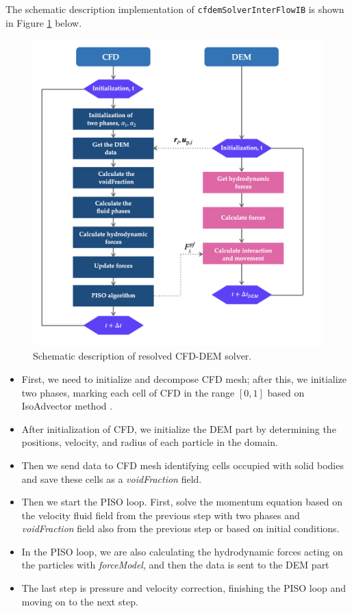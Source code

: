 The schematic description implementation of  \verb|cfdemSolverInterFlowIB| is shown in Figure \ref{fig:cfddemSolver} below. 
\begin{figure}[!ht]
    \centering
    \includegraphics[width=16cm]{Images/chap3/CFD-DEM_scheme.png}
    \caption{Schematic description of resolved CFD-DEM solver.}
    \label{fig:cfddemSolver}
\end{figure}
\begin{itemize}
    \item First, we need to initialize and decompose CFD mesh; after this, we initialize two phases, marking each cell of CFD in the range $[0,1]$ based on IsoAdvector method \cite{roenby2019isoadvector}.
    \item  After initialization of CFD, we initialize the DEM part by determining the positions, velocity, and radius of each particle in the domain.
    \item Then we send data to CFD mesh identifying cells occupied with solid bodies and save these cells as a \textit{voidFraction} field. 
    \item Then we start the PISO loop. First, solve the momentum equation based on the velocity fluid field from the previous step with two phases and \textit{voidFraction} field also from the previous step or based on initial conditions.
    \item In the PISO loop, we are also calculating the hydrodynamic forces acting on the particles with \textit{forceModel}, and then the data is sent to the DEM part
    \item The last step is pressure and velocity correction, finishing the PISO loop and moving on to the next step.
\end{itemize}


